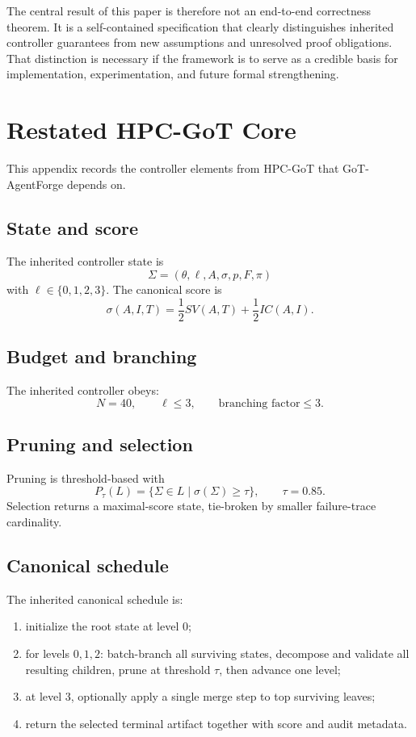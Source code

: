 \documentclass[11pt,a4paper,oneside]{article}
\begin{document}
The central result of this paper is therefore not an end-to-end correctness theorem. It is a self-contained specification that clearly distinguishes inherited controller guarantees from new assumptions and unresolved proof obligations. That distinction is necessary if the framework is to serve as a credible basis for implementation, experimentation, and future formal strengthening.

\appendix

\section{Restated HPC-GoT Core}
This appendix records the controller elements from HPC-GoT that GoT-AgentForge depends on.

\subsection{State and score}
The inherited controller state is
\[
\Sigma=(\theta,\ell,A,\sigma,p,F,\pi)
\]
with $\ell\in\{0,1,2,3\}$. The canonical score is
\[
\sigma(A,I,T)=\frac{1}{2}SV(A,T)+\frac{1}{2}IC(A,I).
\]

\subsection{Budget and branching}
The inherited controller obeys:
\[
N=40,\qquad \ell\le 3,\qquad \text{branching factor}\le 3.
\]

\subsection{Pruning and selection}
Pruning is threshold-based with
\[
P_\tau(L)=\{\Sigma\in L \mid \sigma(\Sigma)\ge \tau\},\qquad \tau=0.85.
\]
Selection returns a maximal-score state, tie-broken by smaller failure-trace cardinality.

\subsection{Canonical schedule}
The inherited canonical schedule is:
\begin{enumerate}[leftmargin=2em]
    \item initialize the root state at level $0$;
    \item for levels $0,1,2$: batch-branch all surviving states, decompose and validate all resulting children, prune at threshold $\tau$, then advance one level;
    \item at level $3$, optionally apply a single merge step to top surviving leaves;
    \item return the selected terminal artifact together with score and audit metadata.
\end{enumerate}
\end{document}
